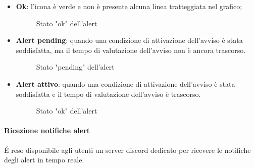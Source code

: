 \begin{itemize}
    \item \textbf{Ok}: l'icona è verde e non è presente alcuna linea tratteggiata nel grafico;
    \begin{figure}[H]
        \centering
        \caption{Stato "ok" dell'alert}
        \label{fig:my_label}
    \end{figure}

    \item \textbf{Alert pending}: quando una condizione di attivazione dell'avviso è stata soddisfatta, ma il tempo di valutazione dell'avviso non è ancora trascorso.
    \begin{figure}[H]
        \centering
        \caption{Stato "pending" dell'alert}
        \label{fig:my_label}
    \end{figure}

    \item \textbf{Alert attivo}: quando una condizione di attivazione dell'avviso è stata soddisfatta e il tempo di valutazione dell'avviso è trascorso.
    \begin{figure}[H]
        \centering
        \caption{Stato "ok" dell'alert}
        \label{fig:my_label}
    \end{figure}
\end{itemize}

\paragraph{Ricezione notifiche alert}
É reso disponibile agli utenti un server discord dedicato per ricevere le notifiche degli alert in tempo reale.\\


